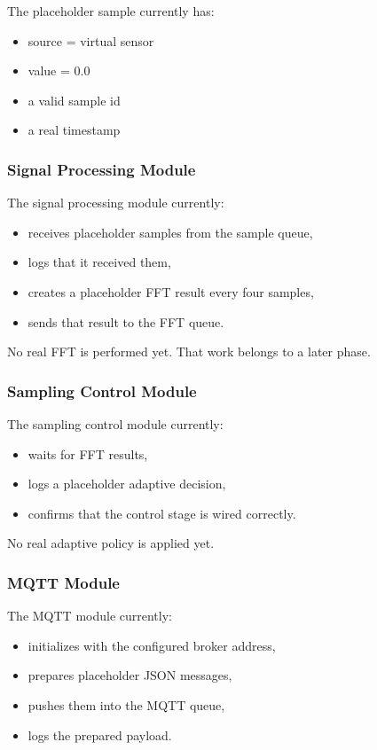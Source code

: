 \documentclass[12pt,a4paper]{article}
\begin{document}
The placeholder sample currently has:

\begin{itemize}
    \item source = virtual sensor
    \item value = 0.0
    \item a valid sample id
    \item a real timestamp
\end{itemize}

\subsubsection{Signal Processing Module}

The signal processing module currently:

\begin{itemize}
    \item receives placeholder samples from the sample queue,
    \item logs that it received them,
    \item creates a placeholder FFT result every four samples,
    \item sends that result to the FFT queue.
\end{itemize}

No real FFT is performed yet. That work belongs to a later phase.

\subsubsection{Sampling Control Module}

The sampling control module currently:

\begin{itemize}
    \item waits for FFT results,
    \item logs a placeholder adaptive decision,
    \item confirms that the control stage is wired correctly.
\end{itemize}

No real adaptive policy is applied yet.

\subsubsection{MQTT Module}

The MQTT module currently:

\begin{itemize}
    \item initializes with the configured broker address,
    \item prepares placeholder JSON messages,
    \item pushes them into the MQTT queue,
    \item logs the prepared payload.
\end{itemize}
\end{document}
